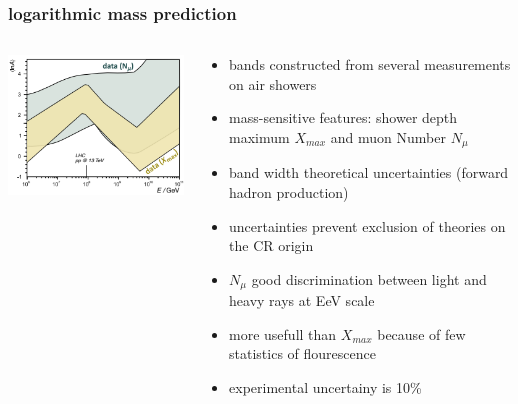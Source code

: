 \documentclass[aspectratio=1610, 9pt]{beamer}
\begin{document}
\begin{frame}\frametitle{logarithmic mass prediction}
  \begin{columns}
    \begin{column}[c]{0.48\textwidth}
      \includegraphics{lnA_right.png}
    \end{column}
    \begin{column}[c]{0.48\textwidth}
      \begin{itemize}
        \item bands constructed from several measurements on air showers
        \item mass-sensitive features: shower depth maximum $X_{max}$ and muon Number $N_{\mu}$
        \item band width \to theoretical uncertainties (forward hadron production)
        \item uncertainties prevent exclusion of theories on the CR origin
        \item $N_{\mu}$ good discrimination between light and heavy rays at EeV scale
        \item more usefull than $X_{max}$ because of few statistics of flourescence
        \item experimental uncertainy is 10\%
      \end{itemize}
    \end{column}
  \end{columns}
\end{frame}
\end{document}

